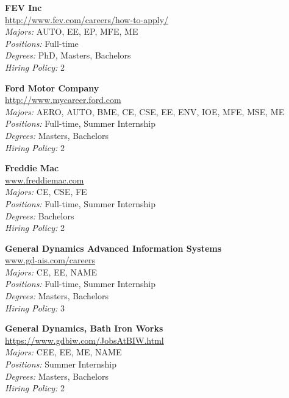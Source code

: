 \documentclass[twoside]{article}
\begin{document}
\begin{center}
\begin{multicols}{3}
\begin{minipage}{.9\columnwidth}{\Large\bf FEV Inc }\\
	\url{http://www.fev.com/careers/how-to-apply/}\\
	\emph{Majors:} AUTO, EE, EP, MFE, ME\\
	\emph{Positions:} Full-time\\
	\emph{Degrees:} PhD, Masters, Bachelors\\
	\emph{Hiring Policy:} 2\\
\end{minipage}
 
\begin{minipage}{.9\columnwidth}{\Large\bf Ford Motor Company }\\
	\url{http://www.mycareer.ford.com}\\
	\emph{Majors:} AERO, AUTO, BME, CE, CSE, EE, ENV, IOE, MFE, MSE, ME\\
	\emph{Positions:} Full-time, Summer Internship\\
	\emph{Degrees:} Masters, Bachelors\\
	\emph{Hiring Policy:} 2\\
\end{minipage}
 
\begin{minipage}{.9\columnwidth}{\Large\bf Freddie Mac }\\
	\url{www.freddiemac.com}\\
	\emph{Majors:} CE, CSE, FE\\
	\emph{Positions:} Full-time, Summer Internship\\
	\emph{Degrees:} Bachelors\\
	\emph{Hiring Policy:} 2\\
\end{minipage}
 
\begin{minipage}{.9\columnwidth}{\Large\bf General Dynamics Advanced Information Systems }\\
	\url{www.gd-ais.com/careers}\\
	\emph{Majors:} CE, EE, NAME\\
	\emph{Positions:} Full-time, Summer Internship\\
	\emph{Degrees:} Masters, Bachelors\\
	\emph{Hiring Policy:} 3\\
\end{minipage}
 
\begin{minipage}{.9\columnwidth}{\Large\bf General Dynamics, Bath Iron Works }\\
	\url{https://www.gdbiw.com/JobsAtBIW.html}\\
	\emph{Majors:} CEE, EE, ME, NAME\\
	\emph{Positions:} Summer Internship\\
	\emph{Degrees:} Masters, Bachelors\\
	\emph{Hiring Policy:} 2\\
\end{minipage}
 

\end{multicols}
\end{center}
\end{document}
